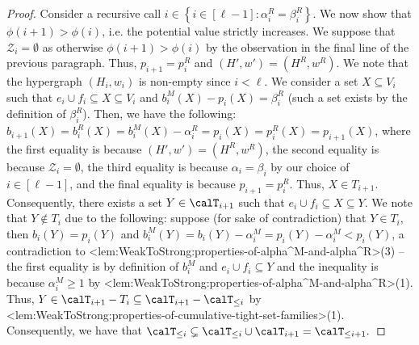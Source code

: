 \documentclass{article}
\def\Cref#1{<#1>}%
\newcommand{\zeros}{\ensuremath{\mathcal{Z}}\xspace}
\newcommand{\maximalTightSetFamily}[1]{\ensuremath{\calT_{#1}}\xspace}
\newcommand{\tightSetFamily}[1]{\ensuremath{T_{#1}}\xspace}
\newcommand{\cumulativeMaximalTightSetFamily}[1]{\ensuremath{\calT_{\leq #1}}}
\newcommand{\maximalTightSetContainingHyperedge}[1]{\ensuremath{\tau_{#1}}\xspace}
\begin{document}
\begin{proof}
Consider a recursive call $i \in \left\{i \in [\ell - 1] : \alpha_i^R = \beta_i^R\right\}$. We now show that $\phi(i+1) > \phi(i)$, i.e. the potential value strictly increases. 
We suppose that $\zeros_i = \emptyset$ as otherwise $\phi(i+1) > \phi(i)$ by the observation in the final line of the previous paragraph.
Thus, $p_{i+1} = p_i^R$ and $(H', w') = (H^R, w^R)$. 
We note that the hypergraph $(H_i, w_i)$ is non-empty since $i < \ell$.
We consider a set $X\subseteq V_i$ such that $e_i\cup f_i\subseteq X\subseteq V_i$ and $b_i^M(X)-p_i(X)=\beta_i^R$ (such a set exists by the definition of $\beta_i^R$). 
Then, we have the following: $b_{i+1}(X) = b_i^R(X)=b_i^M(X)-\alpha_i^R=p_i(X)=p_i^R(X) = p_{i+1}(X)$, where the first equality is because $(H', w') = (H^R, w^R)$, the second equality is because $\zeros_i = \emptyset$, the third equality is because $\alpha_i = \beta_i$ by our choice of $i \in [\ell - 1]$, and the final equality is because $p_{i+1} = p_{i}^R$. Thus, $X \in \tightSetFamily{i+1}$. Consequently, 
there exists a set $Y \in \maximalTightSetFamily{i+1}$ such that $e_i\cup f_i \subseteq X \subseteq Y$. We note that $Y \not \in \tightSetFamily{i}$ due to the following: suppose (for sake of contradiction) that $Y \in \tightSetFamily{i}$, then 
$b_i(Y)=p_i(Y)$ and $b_i^M(Y)=b_i(Y)-\alpha_i^M=p_i(Y)-\alpha_i^M<p_i(Y)$, a contradiction to \Cref{lem:WeakToStrong:properties-of-alpha^M-and-alpha^R}(3) -- the first equality is by definition of $b_i^M$ and $e_i\cup f_i\subseteq Y$ and the inequality is because $\alpha_i^M\ge 1$ by \Cref{lem:WeakToStrong:properties-of-alpha^M-and-alpha^R}(1). Thus, $Y \in \maximalTightSetFamily{i+1} - \tightSetFamily{i} \subseteq \maximalTightSetFamily{i+1} - \cumulativeMaximalTightSetFamily{i}$ by \Cref{lem:WeakToStrong:properties-of-cumulative-tight-set-families}(1).
Consequently, we have that
$\cumulativeMaximalTightSetFamily{i} \subsetneq \cumulativeMaximalTightSetFamily{i} \cup \maximalTightSetFamily{i+1} = \cumulativeMaximalTightSetFamily{i+1}.$


\end{proof}
\end{document}
